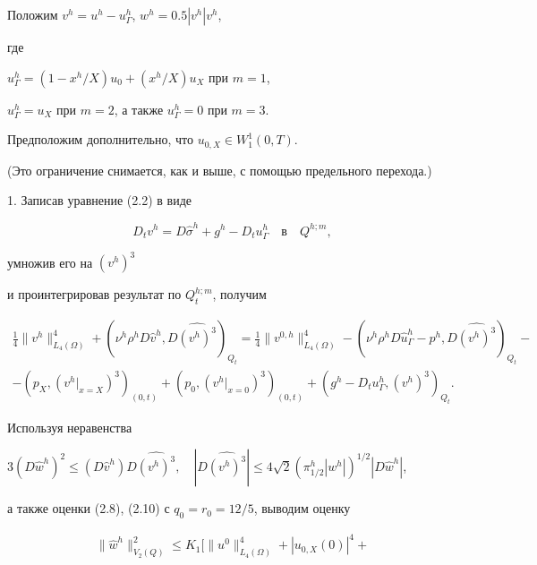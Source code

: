 \begin{pf} Положим $v^h=u^h-u^h_\Gamma$, $w^h=0.5|v^h|v^h$,


где


$u^h_\Gamma=(1-x^h/X)u_0+(x^h/X)u_X$ при $m=1$,


$u^h_\Gamma=u_X$ при $m=2$, а также $u^h_\Gamma=0$ при $m=3$.


Предположим дополнительно, что $u_{0,X}\in W_1^1(0,T)$.


(Это ограничение снимается, как и выше, с помощью предельного перехода.)





1. Записав уравнение (2.2) в виде


\begin{equation}


D_tv^h=D\widehat\sigma^h+g^h-D_tu^h_\Gamma\quad \text{в}\quad Q^{h;m},


\end{equation}


умножив его на $(v^h)^3$


и проинтегрировав результат по $Q^{h;m}_t$, получим


\begin{multline*}


\frac{1}{4}\|v^h\|_{L_4(\Omega)}^4+


(\nu^h\rho^hD\widehat v^h, D\widehat{(v^h)^3})_{Q_t}


=\frac{1}{4}\|v^{0,h}\|_{L_4(\Omega)}^4


-(\nu^h\rho^hD\widehat u^h_\Gamma-p^h, D\widehat{(v^h)^3})_{Q_t}-\\


-(p_X,(v^h|_{x=X})^3)_{(0,t)}+(p_0,(v^h|_{x=0})^3)_{(0,t)}


+(g^h-D_tu^h_\Gamma,(v^h)^3)_{Q_t}.


\end{multline*}


Используя неравенства


$3(D\widehat w^h)^2\le (D\widehat v^h)D\widehat{(v^h)^3},\quad


|D\widehat{(v^h)^3}|\le 4\sqrt{2}(\pi^h_{1/2}|w^h|)^{1/2}|D\widehat w^h|$,


а также оценки (2.8), (2.10) с $q_0=r_0=12/5$, выводим оценку


\begin{multline*}


\|\widehat w^h\|_{V_2(Q)}^2\le


K_1\big[\|u^0\|_{L_4(\Omega)}^4+|u_{0,X}(0)|^4+\\



\end{multline*}
\end{pf}
